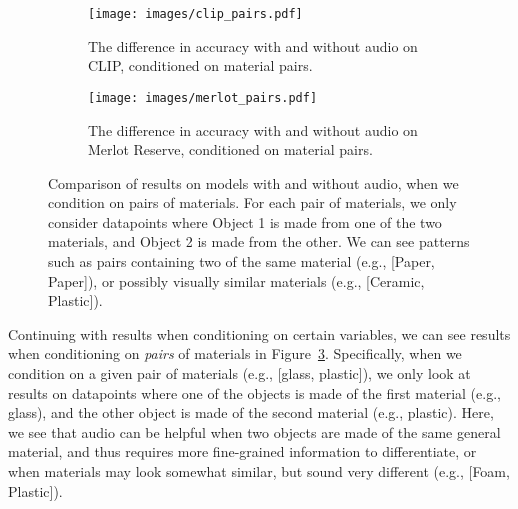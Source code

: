 \documentclass[runningheads]{llncs}
\begin{document}
\begin{figure}[t]
    \begin{subfigure}{0.48\textwidth}
        \centering
        \texttt{[image: images/clip\_pairs.pdf]}
        \caption{The difference in accuracy with and without audio on CLIP, conditioned on material pairs. }
        \label{fig:mat_pairs_clip}
    \end{subfigure}
    \hfill
    \begin{subfigure}{0.48\textwidth}
        \centering
        \texttt{[image: images/merlot\_pairs.pdf]}
        \caption{The difference in accuracy with and without audio on Merlot Reserve, conditioned on material pairs. }
        \label{fig:mat_pairs_merlot}
    \end{subfigure}
    \caption{Comparison of results on models with and without audio, when we condition on pairs of materials. For each pair of materials, we only consider datapoints where Object 1 is made from one of the two materials, and Object 2 is made from the other. We can see patterns such as pairs containing two of the same material (e.g., [Paper, Paper]), or possibly visually similar materials (e.g., [Ceramic, Plastic]).}
    \label{fig:mat_pairs_comp}
\end{figure}

Continuing with results when conditioning on certain variables, we can see results when conditioning on \textit{pairs} of materials in Figure~\ref{fig:mat_pairs_comp}. Specifically, when we condition on a given pair of materials (e.g., [glass, plastic]), we only look at results on datapoints where one of the objects is made of the first material (e.g., glass), and the other object is made of the second material (e.g., plastic). Here, we see that audio can be helpful when two objects are made of the same general material, and thus requires more fine-grained information to differentiate, or when materials may look somewhat similar, but sound very different (e.g., [Foam, Plastic]). 
\end{document}
